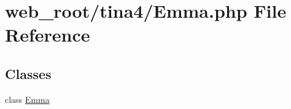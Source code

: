 \hypertarget{Emma_8php}{}\section{web\+\_\+root/tina4/\+Emma.php File Reference}
\label{Emma_8php}
\subsection*{Classes}
\begin{DoxyCompactItemize}
\item 
class \hyperlink{classEmma}{Emma}
\end{DoxyCompactItemize}
